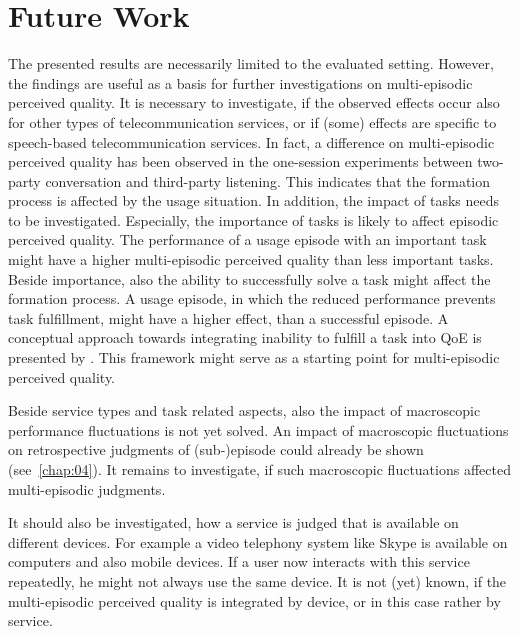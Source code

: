 \section{Future Work}
The presented results are necessarily limited to the evaluated setting.
However, the findings are useful as a basis for further investigations on multi-episodic perceived quality.
It is necessary to investigate, if the observed effects occur also for other types of telecommunication services, or if (some) effects are specific to speech-based telecommunication services.
In fact, a difference on multi-episodic perceived quality has been observed in the one-session experiments between two-party conversation and third-party listening.
This indicates that the formation process is affected by the usage situation.
In addition, the impact of tasks needs to be investigated.
Especially, the importance of tasks is likely to affect episodic perceived quality.
The performance of a usage episode with an important task might have a higher multi-episodic perceived quality than less important tasks.
Beside importance, also the ability to successfully solve a task might affect the formation process.
A usage episode, in which the reduced performance prevents task fulfillment, might have a higher effect, than a successful episode.
A conceptual approach towards integrating inability to fulfill a task into \ac{QoE} is presented by \citet{leon-garcia_generalizing_2014}.
This framework might serve as a starting point for multi-episodic perceived quality.

Beside service types and task related aspects, also the impact of macroscopic performance fluctuations is not yet solved.
An impact of macroscopic fluctuations on retrospective judgments of (sub-)episode could already be shown (see~\autoref{chap:04}).
It remains to investigate, if such macroscopic fluctuations affected multi-episodic judgments.

It should also be investigated, how a service is judged that is available on different devices.
For example a video telephony system like Skype is available on computers and also mobile devices.
If a user now interacts with this service repeatedly, he might not always use the same device.
It is not (yet) known, if the multi-episodic perceived quality is integrated by device, or in this case rather by service.